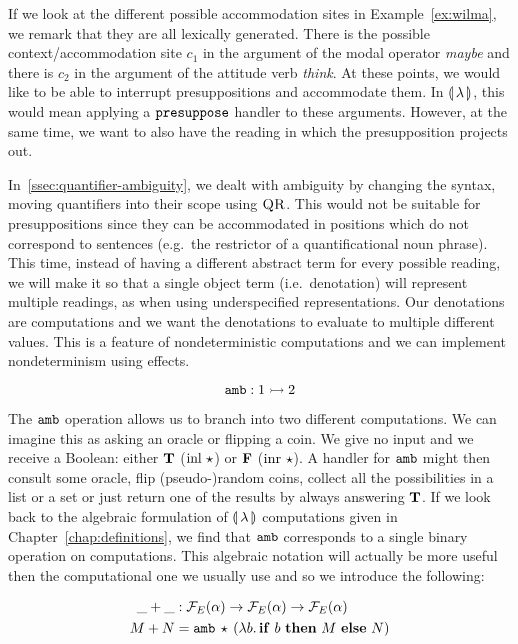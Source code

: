 If we look at the different possible accommodation sites in
Example~\ref{ex:wilma}, we remark that they are all lexically
generated. There is the possible context/accommodation site $c_1$ in the
argument of the modal operator \emph{maybe} and there is $c_2$ in the
argument of the attitude verb \emph{think}. At these points, we would like
to be able to interrupt presuppositions and accommodate them. In
$\llparenthesis \, \lambda \, \rrparenthesis$, this would mean applying a $\mathtt{presuppose}$ handler to
these arguments. However, at the same time, we want to also have the
reading in which the presupposition projects
out.

In~\ref{ssec:quantifier-ambiguity}, we dealt with ambiguity by changing the
syntax, moving quantifiers into their scope using $\textsc{QR}$. This would
not be suitable for presuppositions since they can be accommodated in
positions which do not correspond to sentences (e.g.\ the restrictor of a
quantificational noun phrase). This time, instead of having a different
abstract term for every possible reading, we will make it so that a single
object term (i.e.\ denotation) will represent multiple readings, as when
using underspecified representations. Our denotations are computations and
we want the denotations to evaluate to multiple different values. This is a
feature of nondeterministic computations and we can implement
nondeterminism using effects.

$$
\mathtt{amb} : 1 \rightarrowtail 2
$$

The $\mathtt{amb}$ operation allows us to branch into two different
computations. We can imagine this as asking an oracle or flipping a
coin. We give no input and we receive a Boolean: either $\textbf{T}$
($\operatorname{inl}\,\star$) or $\textbf{F}$ ($\operatorname{inr}\,\star$). A handler for
$\mathtt{amb}$ might then consult some oracle, flip (pseudo-)random coins,
collect all the possibilities in a list or a set or just return one of the
results by always answering $\textbf{T}$. If we look back to the algebraic
formulation of $\llparenthesis \, \lambda \, \rrparenthesis$ computations given in
Chapter~\ref{chap:definitions}, we find that $\mathtt{amb}$ corresponds to a
single binary operation on computations. This algebraic notation will
actually be more useful then the computational one we usually use and so we
introduce the following:

\begin{align*}
  \_+\_ &: \mathcal{F}_E(\alpha) \to \mathcal{F}_E(\alpha) \to \mathcal{F}_E(\alpha) \\
  M + N &= \mathtt{amb}\,\star\,(\lambda b.\, \text{\textbf{if} $b$ \textbf{then} $M$ \textbf{else} $N$})
\end{align*}

